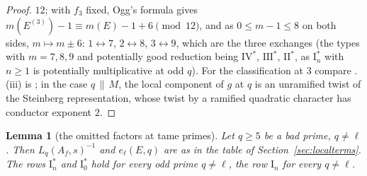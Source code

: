 \documentclass[11pt]{amsart}
\newtheorem{lemma}[theorem]{Lemma}
\theoremstyle{definition}
\begin{document}
\begin{proof}
$12$; with $f_3$ fixed, Ogg's formula gives $m(E^{(3)})-1\equiv m(E)-1+6\pmod{12}$, and as $0\le m-1\le8$ on both sides, $m\mapsto m\pm6$: $1\leftrightarrow7$, $2\leftrightarrow8$, $3\leftrightarrow9$, which are the three exchanges (the types with $m=7,8,9$ and potentially good reduction being $\mathrm{IV}^*$, $\mathrm{III}^*$, $\mathrm{II}^*$, as $\mathrm{I}_n^*$ with $n\ge1$ is potentially multiplicative at odd $q$). For the classification at $3$ compare \cite{Kraus89,Papadopoulos93}. (iii) is \cite[Theorem 3.1 and p.~228]{AtkinLi78}; in the case $q\,\|\,M$, the local component of $g$ at $q$ is an unramified twist of the Steinberg representation, whose twist by a ramified quadratic character has conductor exponent $2$.
\end{proof}

\begin{lemma}[the omitted factors at tame primes]\label{lem:euler}
Let $q\ge5$ be a bad prime, $q\ne\ell$. Then $L_q(A_f,s)^{-1}$ and $e_\ell(E,q)$ are as in the table of Section~\ref{sec:localterms}. The rows $\mathrm{I}_n^*$ and $\mathrm{I}_0^*$ hold for every odd prime $q\ne\ell$, the row $\mathrm{I}_n$ for every $q\ne\ell$.
\end{lemma}
\end{document}
